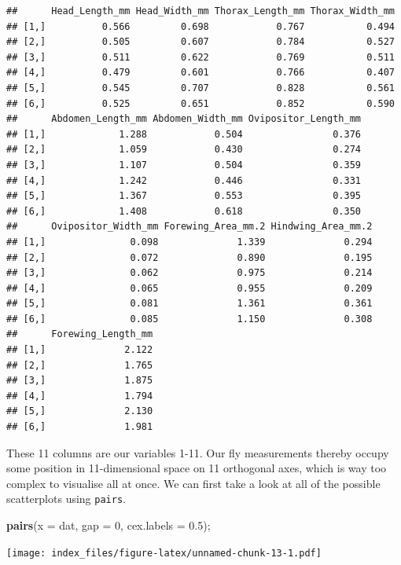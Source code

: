 \documentclass[]{article}
\newenvironment{Shaded}{\begin{snugshade}}{\end{snugshade}}
\newcommand{\DataTypeTok}[1]{\textcolor[rgb]{0.13,0.29,0.53}{#1}}
\newcommand{\DecValTok}[1]{\textcolor[rgb]{0.00,0.00,0.81}{#1}}
\newcommand{\FloatTok}[1]{\textcolor[rgb]{0.00,0.00,0.81}{#1}}
\newcommand{\KeywordTok}[1]{\textcolor[rgb]{0.13,0.29,0.53}{\textbf{#1}}}
\newcommand{\NormalTok}[1]{#1}
\begin{document}
\begin{verbatim}
##      Head_Length_mm Head_Width_mm Thorax_Length_mm Thorax_Width_mm
## [1,]          0.566         0.698            0.767           0.494
## [2,]          0.505         0.607            0.784           0.527
## [3,]          0.511         0.622            0.769           0.511
## [4,]          0.479         0.601            0.766           0.407
## [5,]          0.545         0.707            0.828           0.561
## [6,]          0.525         0.651            0.852           0.590
##      Abdomen_Length_mm Abdomen_Width_mm Ovipositor_Length_mm
## [1,]             1.288            0.504                0.376
## [2,]             1.059            0.430                0.274
## [3,]             1.107            0.504                0.359
## [4,]             1.242            0.446                0.331
## [5,]             1.367            0.553                0.395
## [6,]             1.408            0.618                0.350
##      Ovipositor_Width_mm Forewing_Area_mm.2 Hindwing_Area_mm.2
## [1,]               0.098              1.339              0.294
## [2,]               0.072              0.890              0.195
## [3,]               0.062              0.975              0.214
## [4,]               0.065              0.955              0.209
## [5,]               0.081              1.361              0.361
## [6,]               0.085              1.150              0.308
##      Forewing_Length_mm
## [1,]              2.122
## [2,]              1.765
## [3,]              1.875
## [4,]              1.794
## [5,]              2.130
## [6,]              1.981
\end{verbatim}

These 11 columns are our variables 1-11. Our fly measurements thereby
occupy some position in 11-dimensional space on 11 orthogonal axes,
which is way too complex to visualise all at once. We can first take a
look at all of the possible scatterplots using \texttt{pairs}.

\begin{Shaded}
\begin{Highlighting}[]
\KeywordTok{pairs}\NormalTok{(}\DataTypeTok{x =}\NormalTok{ dat, }\DataTypeTok{gap =} \DecValTok{0}\NormalTok{, }\DataTypeTok{cex.labels =} \FloatTok{0.5}\NormalTok{);}
\end{Highlighting}
\end{Shaded}

\texttt{[image: index\_files/figure-latex/unnamed-chunk-13-1.pdf]}
\end{document}
